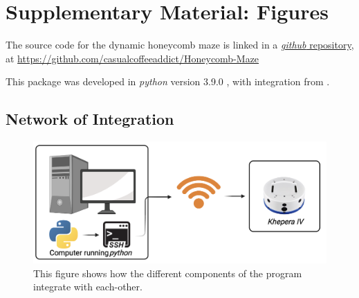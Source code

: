 

\newlength\myindent
\setlength\myindent{2em}
\newcommand\bindent{%
  \begingroup
  \setlength{\itemindent}{\myindent}
  \addtolength{\algorithmicindent}{\myindent}
}
\newcommand\eindent{\endgroup}



\appendix
\section{Supplementary Material: Figures}
The source code for the dynamic honeycomb maze is linked in a  \href{https://github.com/casualcoffeeaddict/Honeycomb-Maze}{\textit{github} repository},\\ at \href{https://github.com/casualcoffeeaddict/Honeycomb-Maze}{https://github.com/casualcoffeeaddict/Honeycomb-Maze}

This package was developed in \textit{python} version 3.9.0 \cite{python3}, with integration from \cite{networkx}.

\subsection{Network of Integration}
\label{fig:integration_network}
\begin{figure}[H]
    \centering
    \includegraphics[scale = 0.6]{images/intergration_netwwork.png}
    \caption{This figure shows how the different components of the program integrate with each-other.}

\end{figure}

